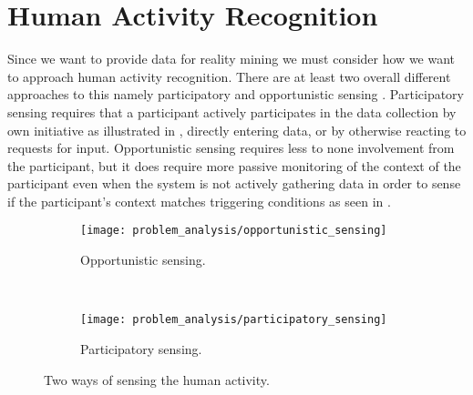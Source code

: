 
\section{Human Activity Recognition}
\label{sec:human_activity_recognition}

Since we want to provide data for reality mining we must consider how we want to approach human activity recognition. There are at least two overall different approaches to this namely participatory and opportunistic sensing \parencite{opp_or_par} \parencite{har_wearables}. Participatory sensing requires that a participant actively participates in the data collection by own initiative as illustrated in , directly entering data, or by otherwise reacting to requests for input. Opportunistic sensing requires less to none involvement from the participant, but it does require more passive monitoring of the context of the participant even when the system is not actively gathering data in order to sense if the participant's context matches triggering conditions as seen in . 

\begin{figure}[!htbp]
\begin{subfigure}[!t]{.45\textwidth}
  \centering
  \texttt{[image: problem\_analysis/opportunistic\_sensing]}
  \caption{Opportunistic sensing.}
  \label{fig:opportunistic_sensing}
\end{subfigure}
~
\begin{subfigure}[!t]{.45\textwidth}
  \centering
  \texttt{[image: problem\_analysis/participatory\_sensing]}
  \caption{Participatory sensing.}
  \label{fig:participatory_sensing}
\end{subfigure}
\caption{Two ways of sensing the human activity.}
\label{fig:sensing_types}
\end{figure}
\FloatBarrier

